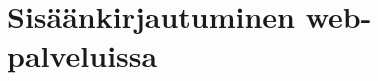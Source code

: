 \documentclass[finnish,gradu]{tktltiki}
\begin{document}





\section{Sisäänkirjautuminen web-palveluissa} %
\label{sec:autentikoituminen_ja_web}
\end{document}
